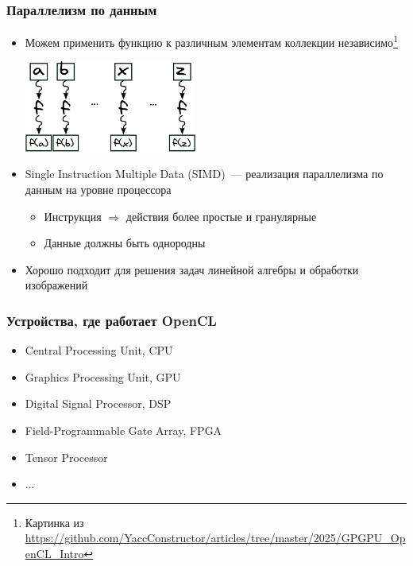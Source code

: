 \documentclass[
    aspectratio=169,
]{beamer}
\begin{document}
\begin{frame}
    \frametitle{Параллелизм по данным}

    \begin{itemize}
        \item Можем применить функцию к различным элементам коллекции независимо\footnote{Картинка из \url{https://github.com/YaccConstructor/articles/tree/master/2025/GPGPU_OpenCL_Intro}}
              \begin{center}
                  \includegraphics[height=3cm]{simd_crp.pdf}
              \end{center}
        \item Single Instruction Multiple Data (SIMD)~--- реализация параллелизма по данным на уровне процессора
              \begin{itemize}
                  \item Инструкция $\Rightarrow$ действия более простые и гранулярные
                  \item Данные должны быть однородны
              \end{itemize}
        \item Хорошо подходит для решения задач линейной алгебры и обработки изображений
    \end{itemize}
\end{frame}

\begin{frame}
    \frametitle{Устройства, где работает OpenCL}

    \begin{itemize}
        \item Central Processing Unit, CPU
        \item Graphics Processing Unit, GPU
        \item Digital Signal Processor, DSP
        \item Field-Programmable Gate Array, FPGA
        \item Tensor Processor
        \item ...
    \end{itemize}

\end{frame}
\end{document}
